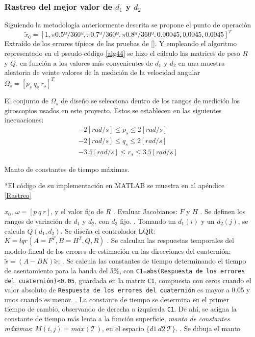 \documentclass[10pt]{report}
\numberwithin{equation}{chapter}
\numberwithin{algorithm}{chapter}
\newcommand{\bcite}[1]{[\cite{#1}]}
\begin{document}
\subsubsection{Rastreo del mejor valor de $d_1$ y $d_2$}
Siguiendo la metodología anteriormente descrita se propone el punto de operación \begin{equation}
\tilde{x}_0=[1,\pi0.5º/360º,\pi0.7º/360º,\pi0.8º/360º,0.00045,0.0045,0.0045] ^T
\end{equation} 
Extraído de los errores típicos de las pruebas de \bcite{Mahony2008,Scandaro2011}. Y empleando el algoritmo representado en el pseudo-código \ref{alg44} se hizo el cálculo las matrices de peso $R$ y $Q$, en función a los valores más convenientes de $d_1$ y $d_2$ en una muestra aleatoria de veinte valores de la medición de la velocidad angular $\Omega_s=[p_s~q_s~r_s]^T$\par
El conjunto de $\Omega_s$ de diseño se selecciona dentro de los rangos de medición los giroscopios usados en este proyecto. Estos se establecen en las siguientes inecuaciones:
\begin{gather}
-2[rad/s]\leq p_s\leq2[rad/s]\\
-2[rad/s]\leq q_s\leq2[rad/s]\\
-3.5[rad/s]\leq r_s\leq3.5[rad/s]
\end{gather}
\begin{algorithm}[t]
\caption{Manto de constantes de tiempo máximas.}\scriptsize{*El código de su implementación en MATLAB se muestra en al apéndice \ref{Rastreo}}\footnotesize
\label{alg44}
\begin{algorithmic}
\Require $x_0$, $\omega=[p~q~r]$, y el valor fijo de $R$
. Evaluar Jacobianos: $F$ y $H$
. Se definen los rangos de variación de $d_1$ y $d_2$, con $d_3$ fijo.
. Tomando un $d_1(i)$ y un $d_2(j)$, se calcula $Q(d_1,d_2)$.
\State Se diseña el controlador LQR: $K=lqr(A=F^T,B=H^T,Q,R)$
. Se calculan las respuestas temporales del modelo lineal de los errores de estimación en las direcciones del cuaternión: $\dot{\tilde{x}}=(A-BK)\tilde{x}$;
. Se calcula las constantes de tiempo determinando el tiempo de asentamiento para la banda del 5\%, con \texttt{C1=abs(Respuesta de los errores del cuaternión)<0.05}, guardada en la matriz \texttt{C1}, compuesta con ceros cuando el valor absoluto de \texttt{Respuesta de los errores del cuaternión} es mayor a 0.05 y unos cuando es menor.
. La constante de tiempo se determina en el primer tiempo de cambio, observando de derecha a izquierda \texttt{C1}. De ahí, se asigna la constante de tiempo más lenta a la función superficie, \emph{manto de constantes máximas}: $M(i,j)=max(\mathcal{T})$, en el espacio $\{d1~d2~\mathcal{T}\}$.
\EndFor
{}. Se dibuja el manto 
\end{algorithmic}
\end{algorithm}
\end{document}
